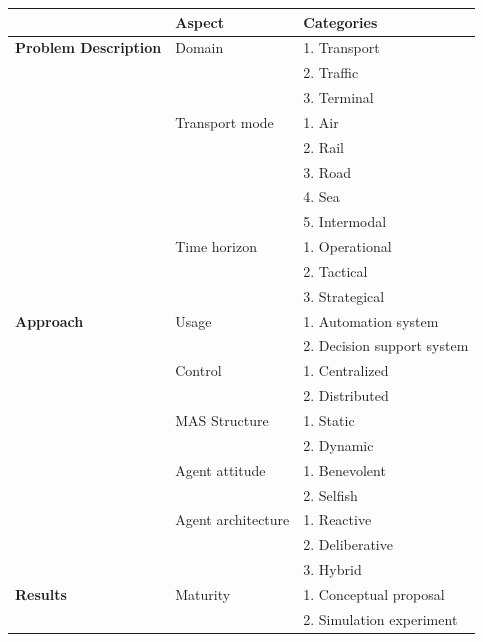 \documentclass[11pt,letterpaper,onecolumn,twoside,openright,final]{report}
\begin{document}
\begin{table}[htbp]
  \centering
    \begin{tabular}{|l|p{}|p{}|}
    \addlinespace
    \hline
          & \textbf{Aspect} & \textbf{Categories} \\
    \hline
    \hline
    \textbf{Problem Description} & Domain & 1. Transport \\
          &       & 2. Traffic \\
          &       & 3. Terminal \\
          \cline{2-3}
          & Transport mode & 1. Air \\
          &       & 2. Rail \\
          &       & 3. Road \\
          &       & 4. Sea \\
          &       & 5. Intermodal \\
          \cline{2-3}
          & Time horizon & 1. Operational \\
          &       & 2. Tactical \\
          &       & 3. Strategical \\
          \hline
    \textbf{Approach} & Usage & 1. Automation system \\
          &       & 2. Decision support system \\
          \cline{2-3}
          & Control & 1. Centralized \\
          &       & 2. Distributed \\
          \cline{2-3}
          & MAS Structure & 1. Static \\
          &       & 2. Dynamic \\
          \cline{2-3}
          & Agent attitude & 1. Benevolent \\
          &       & 2. Selfish \\
          \cline{2-3}
          & Agent architecture & 1. Reactive \\
          &       & 2. Deliberative \\
          &       & 3. Hybrid \\
          \hline
    \textbf{Results} & Maturity & 1. Conceptual proposal \\
          &       & 2. Simulation experiment \\

\end{tabular}
\end{table}
\end{document}
